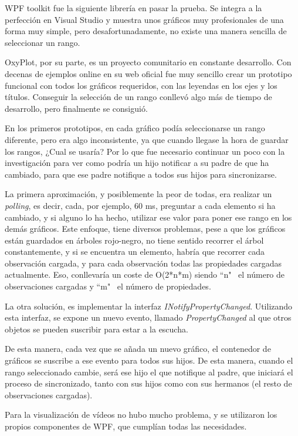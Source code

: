 WPF toolkit fue la siguiente librer\'ia en pasar la prueba. Se integra a la perfecci\'on 
en Visual Studio y muestra unos gr\'aficos muy profesionales de una forma
muy simple, pero desafortunadamente, no existe una manera sencilla de seleccionar un rango.

OxyPlot, por su parte, es un proyecto comunitario en constante desarrollo. Con decenas de ejemplos online en su web
oficial fue muy sencillo crear un prototipo funcional con todos los gr\'aficos requeridos, con las leyendas en los ejes
y los t\'itulos. Conseguir la selecci\'on de un rango conllev\'o algo m\'as de tiempo de desarrollo, pero finalmente 
se consigui\'o.

En los primeros prototipos, en cada gr\'afico pod\'ia seleccionarse un rango diferente, pero era algo inconsistente, ya
que cuando llegase la hora de guardar los rangos, ¿Cual se usar\'ia? Por lo que fue necesario continuar un poco con la 
investigaci\'on para ver como podr\'ia un hijo notificar a su padre de que ha cambiado, para que ese padre notifique a todos
sus hijos para sincronizarse.

La primera aproximaci\'on, y posiblemente la peor de todas, era realizar un \emph{polling}, es decir, cada, por ejemplo, 60 ms,
preguntar a cada elemento si ha cambiado, y si alguno lo ha hecho, utilizar ese valor para poner ese rango en los dem\'as 
gr\'aficos. Este enfoque, tiene diversos problemas, pese a que los gr\'aficos est\'an guardados en \'arboles rojo-negro,
no tiene sentido recorrer el \'arbol constantemente, y si se encuentra un elemento, habr\'ia que recorrer cada observaci\'on cargada,
y para cada observaci\'on todas las propiedades cargadas actualmente. Eso,
conllevar\'ia un coste de O(2*n*m) siendo ``n" \ el n\'umero de observaciones cargadas y ``m" \ el n\'umero de propiedades.

La otra soluci\'on, es implementar la interfaz \emph{INotifyPropertyChanged}. Utilizando esta interfaz, se expone un 
nuevo evento, llamado \emph{PropertyChanged} al que otros objetos se pueden suscribir para estar a la escucha.

De esta manera, cada vez que se a\~nada un nuevo gr\'afico, el contenedor de gr\'aficos se suscribe a ese evento para todos
sus hijos. De esta manera, cuando el rango seleccionado cambie, ser\'a ese hijo el que notifique al padre, que iniciar\'a
el proceso de sincronizado, tanto con sus hijos como con sus hermanos (el resto de observaciones cargadas).

Para la visualizaci\'on de v\'ideos no hubo mucho problema, y se utilizaron los
propios componentes de WPF, que cumpl\'ian todas las necesidades.

